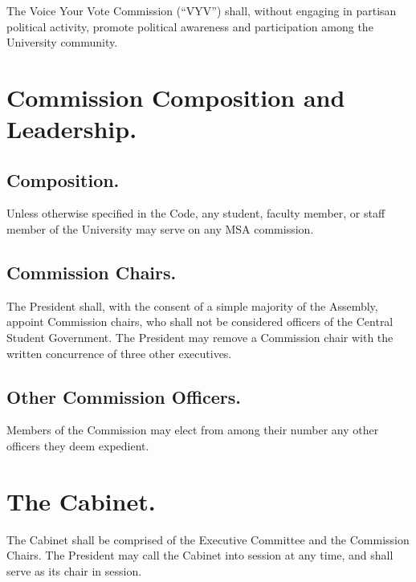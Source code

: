 \subsubsection{}
The Voice Your Vote Commission (``VYV'') shall, without engaging in partisan political activity, promote political awareness and participation among the University community.


\section{Commission Composition and Leadership.}

\subsection{Composition.}
Unless otherwise specified in the Code, any student, faculty member, or staff member of the University may serve on any MSA commission.

\subsection{Commission Chairs.}
The President shall, with the consent of a simple majority of the Assembly, appoint Commission chairs, who shall not be considered officers of the Central Student Government.  The President may remove a
Commission chair with the written concurrence of three other executives.

\subsection{Other Commission Officers.}
Members of the Commission may elect from among their number any other officers they deem expedient.


\section{The Cabinet.}

The Cabinet shall be comprised of the Executive Committee and the Commission Chairs.  The President may call the Cabinet into session at any time, and shall serve as its chair in session.